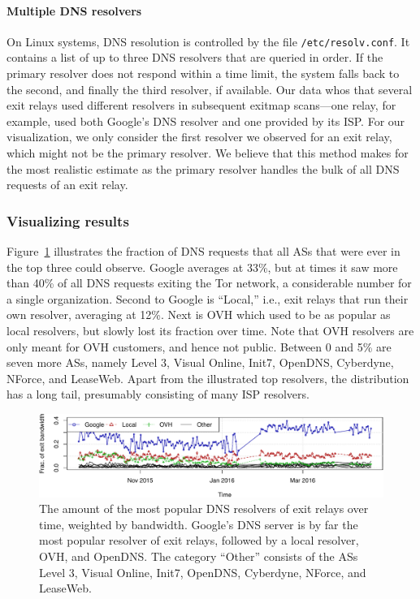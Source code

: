 \paragraph{Multiple DNS resolvers}
On Linux systems, DNS resolution is controlled by the file
\texttt{/etc/resolv.conf}.  It contains a list of up to three DNS resolvers
that are queried in order.  If the primary resolver does not respond within a
time limit, the system falls back to the second, and finally the third
resolver, if available.  Our data whos that several exit relays used different
resolvers in subsequent exitmap scans---one relay, for example, used both
Google's DNS resolver and one provided by its ISP.  For our visualization, we
only consider the first resolver we observed for an exit relay, which might not
be the primary resolver.  We believe that this method makes for the most
realistic estimate as the primary resolver handles the bulk of all DNS requests
of an exit relay.

\subsubsection{Visualizing results}
Figure~\ref{fig:exit-resolvers} illustrates the fraction of DNS requests that
all ASs that were ever in the top three could observe.  Google averages at
33\%, but at times it saw more than 40\% of all DNS requests exiting the Tor
network, a considerable number for a single organization.  Second to Google is
``Local,'' i.e., exit relays that run their own resolver, averaging at 12\%.
Next is OVH which used to be as popular as local resolvers, but slowly lost its
fraction over time.  Note that OVH resolvers are only meant for OVH customers,
and hence not public.  Between 0 and 5\% are seven more ASs, namely Level 3,
Visual Online, Init7, OpenDNS, Cyberdyne, NForce, and LeaseWeb.  Apart from the
illustrated top resolvers, the distribution has a long tail, presumably
consisting of many ISP resolvers.

\begin{figure}[t]
	\centering
	\includegraphics[width=\linewidth]{figures/exit-resolvers.pdf}
	\caption{The amount of the most popular DNS resolvers of exit relays over
	time, weighted by bandwidth.  Google's DNS server is by far the most popular
	resolver of exit relays, followed by a local resolver, OVH, and OpenDNS.
	The category ``Other'' consists of the ASs Level 3, Visual Online, Init7,
	OpenDNS, Cyberdyne, NForce, and LeaseWeb.}
	\label{fig:exit-resolvers}
\end{figure}

